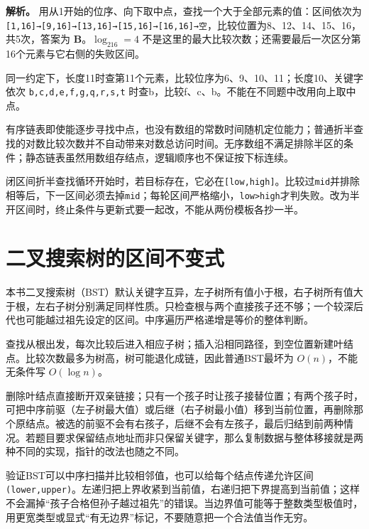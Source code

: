 \textbf{解析。} 用从1开始的位序、向下取中点，查找一个大于全部元素的值：区间依次为 \texttt{[1,\allowbreak{}16]→[9,\allowbreak{}16]→[13,\allowbreak{}16]→[15,\allowbreak{}16]→[16,\allowbreak{}16]→空}，比较位置为8、12、14、15、16，共5次，答案为 \textbf{B}。\(\log_216=4\) 不是这里的最大比较次数；还需要最后一次区分第16个元素与它右侧的失败区间。

同一约定下，长度11时查第11个元素，比较位序为6、9、10、11；长度10、关键字依次 \texttt{b,\allowbreak{}c,\allowbreak{}d,\allowbreak{}e,\allowbreak{}f,\allowbreak{}g,\allowbreak{}q,\allowbreak{}r,\allowbreak{}s,\allowbreak{}t} 时查b，比较f、c、b。不能在不同题中改用向上取中点。

有序链表即使能逐步寻找中点，也没有数组的常数时间随机定位能力；普通折半查找的对数比较次数并不自动带来对数总访问时间。无序数组不满足排除半区的条件；静态链表虽然用数组存结点，逻辑顺序也不保证按下标连续。

\begin{methodbox}[先写查找区间不变式再写边界]

闭区间折半查找循环开始时，若目标存在，它必在\texttt{[low,\allowbreak{}high]}。比较过\texttt{mid}并排除相等后，下一区间必须去掉\texttt{mid}；每轮区间严格缩小，\texttt{low>\allowbreak{}high}才判失败。改为半开区间时，终止条件与更新式要一起改，不能从两份模板各抄一半。

\end{methodbox}

\section{二叉搜索树的区间不变式}\label{DS07-04}

本书二叉搜索树（BST）默认关键字互异，左子树所有值小于根，右子树所有值大于根，左右子树分别满足同样性质。只检查根与两个直接孩子还不够；一个较深后代也可能越过祖先设定的区间。中序遍历严格递增是等价的整体判断。

查找从根出发，每次比较后进入相应子树；插入沿相同路径，到空位置新建叶结点。比较次数最多为树高，树可能退化成链，因此普通BST最坏为 \(O(n)\)，不能无条件写 \(O(\log n)\)。

删除叶结点直接断开双亲链接；只有一个孩子时让孩子接替位置；有两个孩子时，可把中序前驱（左子树最大值）或后继（右子树最小值）移到当前位置，再删除那个原结点。被选的前驱不会有右孩子，后继不会有左孩子，最后归结到前两种情况。若题目要求保留结点地址而非只保留关键字，那么复制数据与整体移接就是两种不同的实现，指针的改法也随之不同。

验证BST可以中序扫描并比较相邻值，也可以给每个结点传递允许区间 \texttt{(\allowbreak{}lower,\allowbreak{}upper)\allowbreak{}}。左递归把上界收紧到当前值，右递归把下界提高到当前值；这样不会漏掉``孩子合格但孙子越过祖先''的错误。当边界值可能等于整数类型极值时，用更宽类型或显式``有无边界''标记，不要随意把一个合法值当作无穷。

